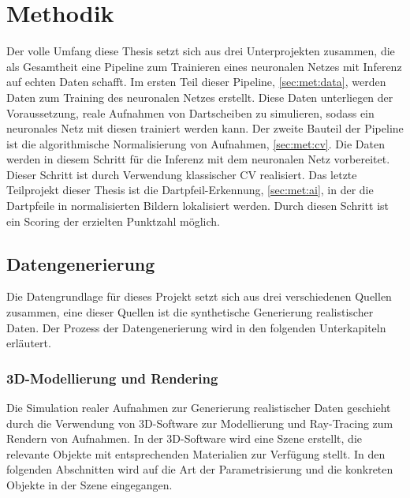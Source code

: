 
\chapter{Methodik}
\label{cha:met}

Der volle Umfang diese Thesis setzt sich aus drei Unterprojekten zusammen, die als Gesamtheit eine Pipeline zum Trainieren eines neuronalen Netzes mit Inferenz auf echten Daten schafft. Im ersten Teil dieser Pipeline, \autoref{sec:met:data}, werden Daten zum Training des neuronalen Netzes erstellt. Diese Daten unterliegen der Voraussetzung, reale Aufnahmen von Dartscheiben zu simulieren, sodass ein neuronales Netz mit diesen trainiert werden kann. Der zweite Bauteil der Pipeline ist die algorithmische Normalisierung von Aufnahmen, \autoref{sec:met:cv}. Die Daten werden in diesem Schritt für die Inferenz mit dem neuronalen Netz vorbereitet. Dieser Schritt ist durch Verwendung klassischer \ac{CV} realisiert. Das letzte Teilprojekt dieser Thesis ist die Dartpfeil-Erkennung, \autoref{sec:met:ai}, in der die Dartpfeile in normalisierten Bildern lokalisiert werden. Durch diesen Schritt ist ein Scoring der erzielten Punktzahl möglich.

\section{Datengenerierung}
\label{sec:met:data}

Die Datengrundlage für dieses Projekt setzt sich aus drei verschiedenen Quellen zusammen, eine dieser Quellen ist die synthetische Generierung realistischer Daten. Der Prozess der Datengenerierung wird in den folgenden Unterkapiteln erläutert.

\subsection{3D-Modellierung und Rendering}
\label{sec:met:data:model}

Die Simulation realer Aufnahmen zur Generierung realistischer Daten geschieht durch die Verwendung von 3D-Software zur Modellierung und Ray-Tracing zum Rendern von Aufnahmen. In der 3D-Software wird eine Szene erstellt, die relevante Objekte mit entsprechenden Materialien zur Verfügung stellt. In den folgenden Abschnitten wird auf die Art der Parametrisierung und die konkreten Objekte in der Szene eingegangen.

